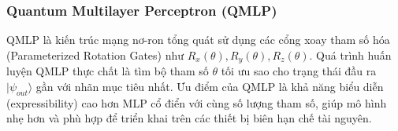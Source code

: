 \subsubsection{Quantum Multilayer Perceptron (QMLP)}
QMLP \cite{shao2018quantummodelmultilayerperceptron} là kiến trúc mạng nơ-ron tổng quát sử dụng các cổng xoay tham số hóa (Parameterized Rotation Gates) như $R_x(\theta), R_y(\theta), R_z(\theta)$.
Quá trình huấn luyện QMLP thực chất là tìm bộ tham số $\theta$ tối ưu sao cho trạng thái đầu ra $|\psi_{out}\rangle$ gần với nhãn mục tiêu nhất. Ưu điểm của QMLP là khả năng biểu diễn (expressibility) cao hơn MLP cổ điển với cùng số lượng tham số, giúp mô hình nhẹ hơn và phù hợp để triển khai trên các thiết bị biên hạn chế tài nguyên.